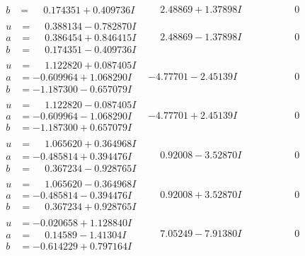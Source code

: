 \documentclass[1p]{elsarticle_modified}
\theoremstyle{definition}
\begin{document}
$$\begin{array}{c|c|c}
\begin{aligned}
b &= \phantom{-}0.174351 + 0.409736 I\end{aligned}
 & \phantom{-}2.48869 + 1.37898 I & \phantom{-0.000000 } 0 \\ \hline\begin{aligned}
u &= \phantom{-}0.388134 - 0.782870 I \\
a &= \phantom{-}0.386454 + 0.846415 I \\
b &= \phantom{-}0.174351 - 0.409736 I\end{aligned}
 & \phantom{-}2.48869 - 1.37898 I & \phantom{-0.000000 } 0 \\ \hline\begin{aligned}
u &= \phantom{-}1.122820 + 0.087405 I \\
a &= -0.609964 + 1.068290 I \\
b &= -1.187300 - 0.657079 I\end{aligned}
 & -4.77701 - 2.45139 I & \phantom{-0.000000 } 0 \\ \hline\begin{aligned}
u &= \phantom{-}1.122820 - 0.087405 I \\
a &= -0.609964 - 1.068290 I \\
b &= -1.187300 + 0.657079 I\end{aligned}
 & -4.77701 + 2.45139 I & \phantom{-0.000000 } 0 \\ \hline\begin{aligned}
u &= \phantom{-}1.065620 + 0.364968 I \\
a &= -0.485814 + 0.394476 I \\
b &= \phantom{-}0.367234 - 0.928765 I\end{aligned}
 & \phantom{-}0.92008 - 3.52870 I & \phantom{-0.000000 } 0 \\ \hline\begin{aligned}
u &= \phantom{-}1.065620 - 0.364968 I \\
a &= -0.485814 - 0.394476 I \\
b &= \phantom{-}0.367234 + 0.928765 I\end{aligned}
 & \phantom{-}0.92008 + 3.52870 I & \phantom{-0.000000 } 0 \\ \hline\begin{aligned}
u &= -0.020658 + 1.128840 I \\
a &= \phantom{-}0.14589 - 1.41304 I \\
b &= -0.614229 + 0.797164 I\end{aligned}
 & \phantom{-}7.05249 - 7.91380 I & \phantom{-0.000000 } 0 \\ \hline\begin{aligned}

\end{aligned}
\end{array}$$
\end{document}
